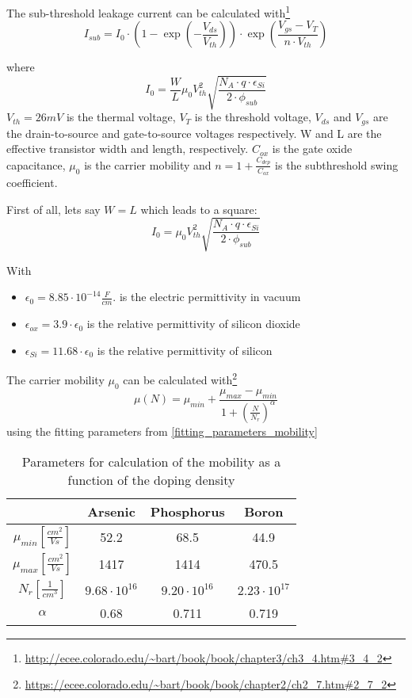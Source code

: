 The sub-threshold leakage current can be calculated with\footnote{\url{http://ecee.colorado.edu/\~bart/book/book/chapter3/ch3_4.htm\#3_4_2}}
\begin{equation}
I_{sub}
=
I_0
\cdot
\left(1-\exp\left(-\frac{V_{ds}}{V_{th}}\right)\right)
\cdot
\exp\left(\frac{V_{gs}-V_{T}}{n \cdot V_{th}}\right)
\end{equation}

where
\begin{equation}
I_0 = \frac{W}{L} \mu_0 V_{th}^2 \sqrt{\frac{N_A \cdot q \cdot \epsilon_{Si}}{2 \cdot \phi_{sub}}}
\end{equation}
$V_{th}=26mV$ is the thermal voltage, $V_T$ is the threshold voltage, $V_{ds}$ and $V_{gs}$ are the drain-to-source and gate-to-source voltages respectively.
W and L are the effective transistor width and length, respectively. $C_{ox}$ is the gate oxide capacitance, $\mu_0$ is the carrier mobility and $n=1+\frac{C_{dep}}{C_{ox}}$ is the subthreshold swing coefficient.

First of all, lets say $W=L$ which leads to a square:
\begin{equation}
I_0 = \mu_0 V_{th}^2 \sqrt{\frac{N_A \cdot q \cdot \epsilon_{Si}}{2 \cdot \phi_{sub}}}
\end{equation}

With
\begin{itemize}
\item $\epsilon_0 = 8.85 \cdot 10^{-14}\frac{F}{cm}. $ is the electric permittivity in vacuum
\item $\epsilon_{ox} =3.9 \cdot \epsilon_0$ is the relative permittivity of silicon dioxide
\item $\epsilon_{Si} =11.68 \cdot \epsilon_0$ is the relative permittivity of silicon
\end{itemize}

The carrier mobility $ \mu_0$ can be calculated with\footnote{\url{https://ecee.colorado.edu/\~bart/book/book/chapter2/ch2_7.htm\#2_7_2}}
\begin{equation}
 \mu(N) =  \mu_{min} + \frac{ \mu_{max}- \mu_{min}}{1+\left(\frac{N}{N_r}\right)^\alpha}
\end{equation}
using the fitting parameters from \autoref{fitting_parameters_mobility}

\begin{table}[H]
	\centering
	\begin{tabular}{|c|c|c|c|}
		\hline
		{} &
		\textbf{Arsenic} &	
		\textbf{Phosphorus} &
		\textbf{Boron} \\
		\hline
		$\mu_{min} [\frac{cm^2}{Vs}]$ &
		52.2 &
		68.5 &		
		44.9 \\
		\hline
		$\mu_{max} [\frac{cm^2}{Vs}]$ &
		1417 &
		1414 &
		470.5 \\
		\hline
		$N_r [\frac{1}{cm^3}]$ &
		$9.68 \cdot 10^{16}$ &
		$9.20 \cdot 10^{16}$ &
		$2.23 \cdot 10^{17}$ \\
		\hline
		$\alpha$ &
		0.68 &
		0.711 &
		0.719 \\
		\hline
	\end{tabular}
	\caption{Parameters for calculation of the mobility as a function of the doping density}
	\label{fitting_parameters_mobility}
\end{table}


